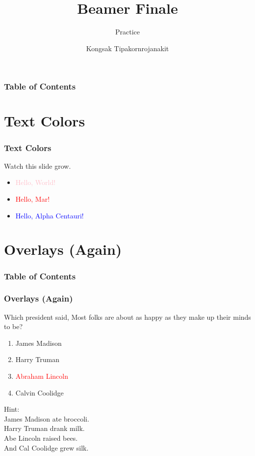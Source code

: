 \documentclass{beamer}
\title{Beamer Finale}
\subtitle{Practice}
\author{Kongsak Tipakornrojanakit}
\institute{Mahidol University, International College}
\theoremstyle{plain}
\begin{document}
\begin{frame}
\titlepage
\end{frame}

\begin{frame}
\frametitle{Table of Contents}
\tableofcontents[currentsection]
\end{frame}

\section{Text Colors}
\begin{frame}
\frametitle{Text Colors}
Watch this slide grow.

\begin{itemize}
\item<2-> \textcolor{pink}{Hello, World!}
\item<3-> \textcolor{red}{Hello, Mar!}
\item<4-> \textcolor{blue}{Hello, Alpha Centauri!}
\end{itemize}

\end{frame}

\section{Overlays (Again)}
\begin{frame}
\frametitle{Table of Contents}
\tableofcontents[currentsection]
\end{frame}

\begin{frame}
\frametitle{Overlays (Again)}
Which president said, Most folks are about as happy as they make up their minds to be?

\begin{enumerate}[A]
\item<2-5> James Madison
\item<3-5> Harry Truman
\item<4-6> \textcolor<6>{red}{Abraham Lincoln} 
\item<5-5> Calvin Coolidge
\end{enumerate}

 Hint: \\
 James Madison ate broccoli.\\
 Harry Truman drank milk.\\
 Abe Lincoln raised bees.\\
 And Cal Coolidge grew silk.
\end{frame}
\end{document}
